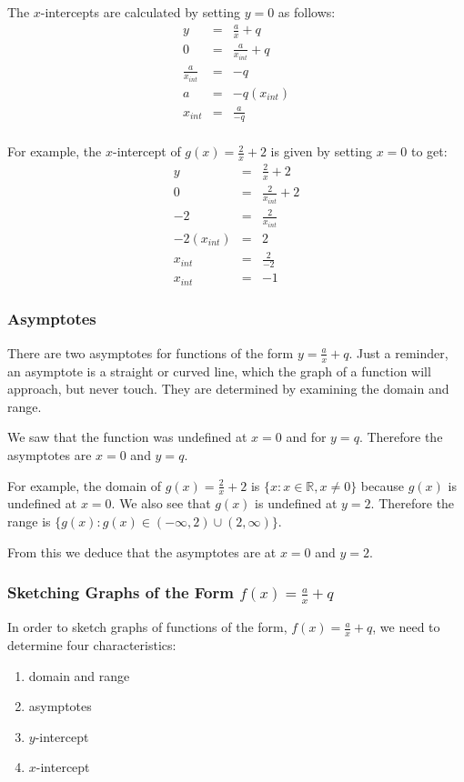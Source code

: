 \documentclass[10pt,a4paper,titlepage,twoside,openright]{report}
\begin{document}
The $x$-intercepts are calculated by setting $y=0$ as follows:
\begin{eqnarray}
y&=&\frac{a}{x} + q\\
0&=&\frac{a}{x_{int}} + q\\
\frac{a}{x_{int}}&=&-q\\
a&=&-q(x_{int})\\
x_{int}&=&\frac{a}{-q}\\
\end{eqnarray}

For example, the $x$-intercept of $g(x)=\frac{2}{x} + 2$ is given by setting $x=0$ to get:
\begin{eqnarray*}
y&=&\frac{2}{x} + 2\\
0&=&\frac{2}{x_{int}} + 2\\
-2&=&\frac{2}{x_{int}}\\
-2(x_{int})&=&2\\
x_{int}&=&\frac{2}{-2}\\
x_{int}&=&-1
\end{eqnarray*}

\subsubsection{Asymptotes}
There are two asymptotes for functions of the form $y=\frac{a}{x} + q$. Just a reminder, an asymptote is a straight or curved line, which the graph of a function will approach, but never touch. They are determined by examining the domain and range.

We saw that the function was undefined at $x=0$ and for $y=q$. Therefore the asymptotes are $x=0$ and $y=q$.

For example, the domain of $g(x)=\frac{2}{x} + 2$ is $\{x:x\in\mathbb{R}, x\ne 0\}$ because $g(x)$ is undefined at $x=0$. We also see that $g(x)$ is undefined at $y=2$. Therefore the range is $\{g(x):g(x)\in(-\infty,2)\cup(2,\infty)\}$.

From this we deduce that the asymptotes are at $x=0$ and $y=2$.

\subsubsection{Sketching Graphs of the Form $f(x)=\frac{a}{x} + q$}
In order to sketch graphs of functions of the form, $f(x)=\frac{a}{x} + q$, we need to determine four characteristics:
\begin{enumerate}
\item{domain and range}
\item{asymptotes}
\item{$y$-intercept}
\item{$x$-intercept}
\end{enumerate}
\end{document}
